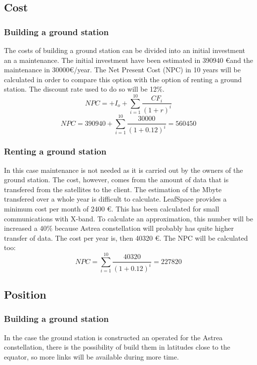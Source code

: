 \subsection{Cost}
\subsubsection{Building a ground station}
The costs of building a ground station can be divided into an initial investment an a maintenance. The initial investment have been estimated in 390940 \euro and the maintenance in 30000\euro /year. The Net Present Cost (NPC) in 10 years will be calculated in order to compare this option with the option of renting a ground station. The discount rate used to do so will be 12\%.
\begin{equation}
NPC=+I_{o}+\sum_{i=1}^{10} \frac{CF_{i}}{(1+r)^i}
\end{equation}
\begin{equation}
NPC=390940+\sum_{i=1}^{10} \frac{30000}{(1+0.12)^i}=560450
\end{equation}
\subsubsection{Renting a ground station}
In this case maintenance is not needed as it is carried out by the owners of the ground station. The cost, however, comes from the amount of data that is transfered from the satellites to the client. The estimation of the Mbyte transfered over a whole year is difficult to calculate. LeafSpace provides a minimum cost per month of 2400 \euro . This has been calculated for small communications  with X-band. To calculate an approximation, this number will be increased a 40\% because Astrea constellation will probably has quite higher transfer of data. The cost per year is, then 40320 \euro. The NPC will be calculated too: 
 \begin{equation}
NPC=\sum_{i=1}^{10} \frac{40320}{(1+0.12)^i}=227820 
\end{equation}
\subsection{Position}
\subsubsection{Building a ground station}
In the case the ground station is constructed an operated for the Astrea constellation, there is the possibility of build them in latitudes close to the equator, so more links will be available during more time. 
